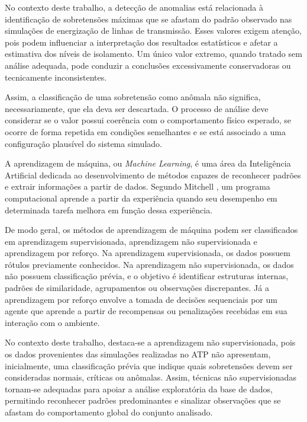 \documentclass[
	12pt,				%
	openright,			%
	oneside,			%
	a4paper,			%
	chapter=TITLE,		%
	section=TITLE,		%
	subsection=TITLE,	%
	subsubsection=TITLE,%
	english,			%
	brazilian			%
	]{abntex2}
\theoremstyle{definition}
\begin{document}
No contexto deste trabalho, a detecção de anomalias está relacionada à identificação de sobretensões máximas que se afastam do padrão observado nas simulações de energização de linhas de transmissão. Esses valores exigem atenção, pois podem influenciar a interpretação dos resultados estatísticos e afetar a estimativa dos níveis de isolamento. Um único valor extremo, quando tratado sem análise adequada, pode conduzir a conclusões excessivamente conservadoras ou tecnicamente inconsistentes.

Assim, a classificação de uma sobretensão como anômala não significa, necessariamente, que ela deva ser descartada. O processo de análise deve considerar se o valor possui coerência com o comportamento físico esperado, se ocorre de forma repetida em condições semelhantes e se está associado a uma configuração plausível do sistema simulado.

A aprendizagem de máquina, ou \textit{Machine Learning}, é uma área da Inteligência Artificial dedicada ao desenvolvimento de métodos capazes de reconhecer padrões e extrair informações a partir de dados. Segundo Mitchell \cite{mitchell1997}, um programa computacional aprende a partir da experiência quando seu desempenho em determinada tarefa melhora em função dessa experiência.

De modo geral, os métodos de aprendizagem de máquina podem ser classificados em aprendizagem supervisionada, aprendizagem não supervisionada e aprendizagem por reforço. Na aprendizagem supervisionada, os dados possuem rótulos previamente conhecidos. Na aprendizagem não supervisionada, os dados não possuem classificação prévia, e o objetivo é identificar estruturas internas, padrões de similaridade, agrupamentos ou observações discrepantes. Já a aprendizagem por reforço envolve a tomada de decisões sequenciais por um agente que aprende a partir de recompensas ou penalizações recebidas em sua interação com o ambiente.

No contexto deste trabalho, destaca-se a aprendizagem não supervisionada, pois os dados provenientes das simulações realizadas no ATP não apresentam, inicialmente, uma classificação prévia que indique quais sobretensões devem ser consideradas normais, críticas ou anômalas. Assim, técnicas não supervisionadas tornam-se adequadas para apoiar a análise exploratória da base de dados, permitindo reconhecer padrões predominantes e sinalizar observações que se afastam do comportamento global do conjunto analisado.
\end{document}
